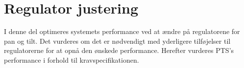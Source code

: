 \part{Regulator justering}
I denne del optimeres systemets performance ved at ændre på regulatorene for pan og tilt. 
Det vurderes om det er nødvendigt med yderligere tilføjelser til regulatorerne 
for at opnå den ønskede performance.
Herefter vurderes PTS's performance i forhold til kravspecifikationen.

%
